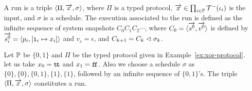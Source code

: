 {A run is a triple $\langle{\Pi, \overrightarrow x, \sigma}\rangle$,
where $\Pi$ is a typed protocol,
$\overrightarrow x \in \prod_{i\in \mathbb{P}} \mathcal{T}^-(\iota_i)$ is the input,
and $\sigma$ is a schedule.
The execution associated to the run
is defined as the infinite sequence of system snapshots
$C_0C_1C_2\cdots$, where $C_0 = \langle{\overrightarrow{s^0}, \overrightarrow{v^0}}\rangle$ is
defined by $\overrightarrow{s^0_i} = \langle{p_i, [\texttt{i}_i\mapsto x_i]}\rangle$ and
$v_c = \epsilon$,
and $C_{k+1} = C_{k}\vartriangleleft
\sigma_{k}$.

 \begin{example}
  Let $\mathbb{P}$ be $\{0,1\}$ and $\Pi$ be the typed protocol given in
  Example~\ref{ex:xor-protocol}.
  let us take $x_0 = \texttt{t\kern -1.2pt t}$ and $x_1 = \texttt{f\kern -1.7pt f}$.
  Also we choose a schedule $\sigma$ as
  $\{0\}, \{0\}, \{0,1\}, \{1\}, \{1\}$, followed by an infinite
  sequence of $\{0,1\}$'s.
  The triple $\langle{\Pi,\overrightarrow x,\sigma}\rangle$ constitutes a run.


\end{example}}

